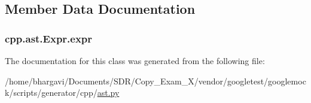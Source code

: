 \subsection{Member Data Documentation}
\subsubsection[{\texorpdfstring{expr}{expr}}]{\setlength{\rightskip}{0pt plus 5cm}cpp.\+ast.\+Expr.\+expr}\hypertarget{classcpp_1_1ast_1_1_expr_a2f4e13fb0176f2616f8703103c806462}{}\label{classcpp_1_1ast_1_1_expr_a2f4e13fb0176f2616f8703103c806462}


The documentation for this class was generated from the following file\+:\begin{DoxyCompactItemize}
\item 
/home/bhargavi/\+Documents/\+S\+D\+R/\+Copy\+\_\+\+Exam\+\_\+X/vendor/googletest/googlemock/scripts/generator/cpp/\hyperlink{ast_8py}{ast.\+py}\end{DoxyCompactItemize}
